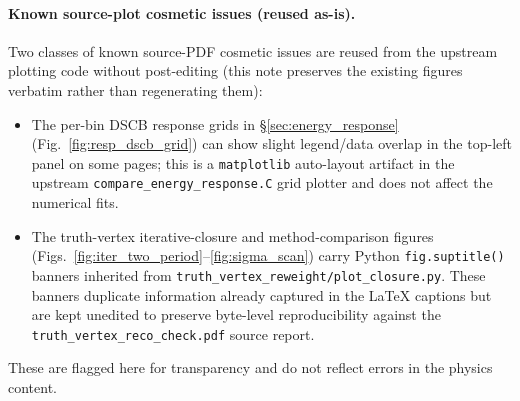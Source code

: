 \documentclass[11pt,a4paper]{article}
\begin{document}
\paragraph{Known source-plot cosmetic issues (reused as-is).}
Two classes of known source-PDF cosmetic issues are reused from the
upstream plotting code without post-editing (this note preserves the
existing figures verbatim rather than regenerating them):
\begin{itemize}\setlength\itemsep{1pt}
\item The per-bin DSCB response grids in \S\ref{sec:energy_response}
  (Fig.~\ref{fig:resp_dscb_grid}) can show slight legend/data overlap
  in the top-left panel on some pages; this is a \texttt{matplotlib}
  auto-layout artifact in the upstream \texttt{compare\_energy\_response.C}
  grid plotter and does not affect the numerical fits.
\item The truth-vertex iterative-closure and method-comparison
  figures (Figs.~\ref{fig:iter_two_period}--\ref{fig:sigma_scan})
  carry Python \texttt{fig.suptitle()} banners inherited from
  \texttt{truth\_vertex\_reweight/plot\_closure.py}. These banners
  duplicate information already captured in the LaTeX captions but
  are kept unedited to preserve byte-level reproducibility against
  the \texttt{truth\_vertex\_reco\_check.pdf} source report.
\end{itemize}
These are flagged here for transparency and do not reflect errors in
the physics content.
\end{document}

